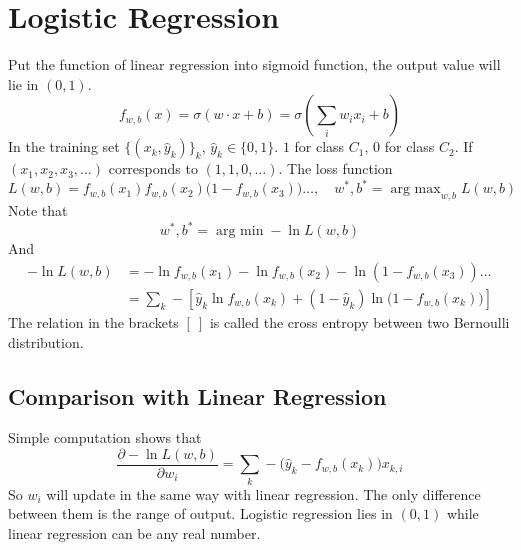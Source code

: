 \documentclass{article}
\DeclareMathOperator*{\argmax}{arg~max}
\DeclareMathOperator*{\argmin}{arg~min}
\begin{document}
    \section{Logistic Regression}
        Put the function of linear regression into sigmoid function, the output value will lie in $(0,1)$.
        \[
            f_{w,b}(x)=\sigma(w \cdot x + b)=\sigma\left(\sum_i w_ix_i+b\right)
        \]
        In the training set $\{(x_k,\hat{y}_k)\}_k$, $\hat{y}_k\in\{0,1\}$. $1$ for class $C_1$, $0$ for class $C_2$. If $(x_1,x_2,x_3,\dots)$ corresponds to $(1,1,0,\dots)$. The loss function
        \[
            L(w,b) = f_{w,b}(x_1)f_{w,b}(x_2)\big(1-f_{w,b}(x_3)\big)\dots,\quad w^*,b^*=\argmax_{w,b}L(w,b)
        \]
        Note that
        \[
            w^*,b^*=\argmin -\ln L(w,b)
        \]
        And
        \begin{align*}
            -\ln L(w,b) &= -\ln f_{w,b}(x_1)-\ln f_{w,b}(x_2)-\ln(1-f_{w,b}(x_3))\dots\\
                        &= \sum_{k}-\left[\hat{y}_k \ln f_{w,b}(x_k)+(1-\hat{y}_k)\ln \big(1-f_{w,b}(x_k)\big)\right]
        \end{align*}
        The relation in the brackets $[~]$ is called the cross entropy between two Bernoulli distribution.
        
        \subsection{Comparison with Linear Regression}
            Simple computation shows that
            \[
                \frac{\partial -\ln L(w,b)}{\partial w_i}=\sum_k -\big(\hat{y}_k-f_{w,b}(x_k)\big)x_{k,i}
            \]
            So $w_i$ will update in the same way with linear regression. The only difference between them is the range of output. Logistic regression lies in $(0,1)$ while linear regression can be any real number.
\end{document}
